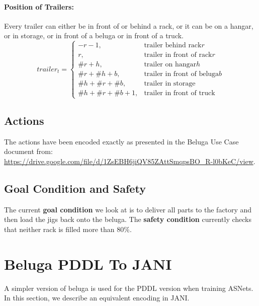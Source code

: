 \documentclass{article}
\newcommand{\numRacks}[0]{\ensuremath{\# r}}
\newcommand{\numHangars}[0]{\ensuremath{\# h}}
\newcommand{\numBelugas}[0]{\ensuremath{\# b}}
\begin{document}
\paragraph*{Position of Trailers:} Every trailer can either be in front of or behind a rack, or it can be on a hangar, or in storage, or in front of a beluga or in front of a truck.
\begin{equation*}
    trailer_t =\begin{cases*}
        -r - 1, & \text{trailer behind rack} {r}\\
        r, & \text{trailer in front of rack} {r} \\
        \numRacks + h, & \text{trailer on hangar} {h} \\
        \numRacks + \numHangars + b, & \text{trailer in front of beluga} {b}\\
        \numHangars + \numRacks + \numBelugas, & \text{trailer in storage}\\
        \numHangars + \numRacks + \numBelugas + 1, & \text{trailer in front of truck}
        \end{cases*}
\end{equation*}


\subsection{Actions}
The actions have been encoded exactly as presented in the Beluga Use Case document from: \url{https://drive.google.com/file/d/1ZsEBH6jiQV85ZAttSmqpsBO_R-l0bKeC/view}.

\subsection{Goal Condition and Safety}
The current \textbf{goal condition} we look at is to deliver all parts to the factory and then load the jigs back onto the beluga.
The \textbf{safety condition} currently checks that neither rack is filled more than $80\%$.

\section{Beluga PDDL To JANI}
A simpler version of beluga is used for the PDDL version when training ASNets. In this section, we describe an equivalent encoding in JANI. 
\end{document}
